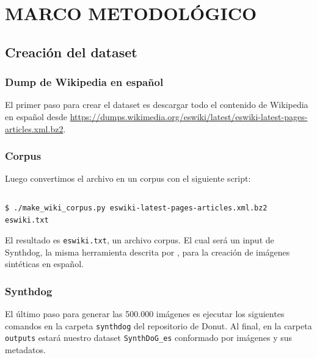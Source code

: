 \documentclass[../main.tex]{subfiles}
\begin{document}
\chapter{MARCO METODOLÓGICO}


\section{Creación del dataset}
\subsection{Dump de Wikipedia en español}

El primer paso para crear el dataset es descargar todo el contenido de Wikipedia en español desde \url{https://dumps.wikimedia.org/eswiki/latest/eswiki-latest-pages-articles.xml.bz2}.

\subsection{Corpus}
Luego convertimos el archivo en un corpus con el siguiente script:
\inputminted[bgcolor=codeBack, tabsize=2]{python}{make_wiki_corpus.py}
\begin{verbatim}
$ ./make_wiki_corpus.py eswiki-latest-pages-articles.xml.bz2 eswiki.txt
\end{verbatim}

El resultado es \texttt{eswiki.txt}, un archivo corpus.
El cual será un input de Synthdog, la misma herramienta descrita por \citet{kim2022ocrfree}, para la creación de imágenes sintéticas en español.

\subsection{Synthdog}

El último paso para generar las 500.000 imágenes es ejecutar los siguientes comandos en la carpeta \texttt{synthdog} del repositorio de Donut\cite{kim2022ocrfree}.
Al final, en la carpeta \texttt{outputs} estará nuestro dataset \texttt{SynthDoG\_es}
conformado por imágenes y sus metadatos.
\end{document}
